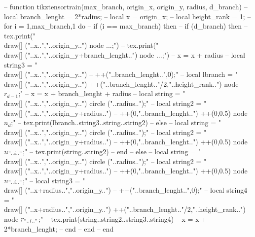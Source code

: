 \begin{luacode*}
  
    -- function tikztensortrain(max_branch, origin_x, origin_y, radius, d_branch)
    --   local branch_lenght = 2*radius;
    --   local x = origin_x;
    --   local height_rank = 1;
    --   for i = 1,max_branch,1 do
    --     if (i == max_branch) then
    --       if (d_branch) then
    --         tex.print("\\draw[] ("..x..","..origin_y..") node {...};")
    --         tex.print("\\draw[] ("..x..","..origin_y+branch_lenght..") node {...};")
    --         x = x + radius
    --         local string3 = "\\draw[] ("..x..","..origin_y..") -- ++("..branch_lenght..",0);"
    --         local lbranch = "\\draw[] ("..x..","..origin_y..") ++("..branch_lenght.."/2,"..height_rank..") node {$r_{d-1}$};"
    --         x = x + branch_lenght + radius
    --         local string = "\\draw[] ("..x..","..origin_y..") circle ("..radius..");"
    --         local string2 = "\\draw[] ("..x..","..origin_y+radius..") -- ++(0,"..branch_lenght..") ++(0,0.5) node {$n_{d}$};"
    --         tex.print(lbranch..string3..string..string2)
    --       else
    --         local string = "\\draw[] ("..x..","..origin_y..") circle ("..radius..");"
    --         local string2 = "\\draw[] ("..x..","..origin_y+radius..") -- ++(0,"..branch_lenght..") ++(0,0.5) node {$n_{"..i.."}$};"
    --         tex.print(string..string2)
    --       end
    --     else
    --       local string = "\\draw[] ("..x..","..origin_y..") circle ("..radius..");"
    --       local string2 = "\\draw[] ("..x..","..origin_y+radius..") -- ++(0,"..branch_lenght..") ++(0,0.5) node {$n_{"..i.."}$};"
    --       local string3 = "\\draw[] ("..x+radius..","..origin_y..") -- ++("..branch_lenght..",0);"
    --       local string4 = "\\draw[] ("..x+radius..","..origin_y..") ++("..branch_lenght.."/2,"..height_rank..") node { $r_{"..i.."}$};"
    --       tex.print(string..string2..string3..string4)
    --       x = x + 2*branch_lenght;
    --     end
    --   end
    -- end


\end{luacode*}
